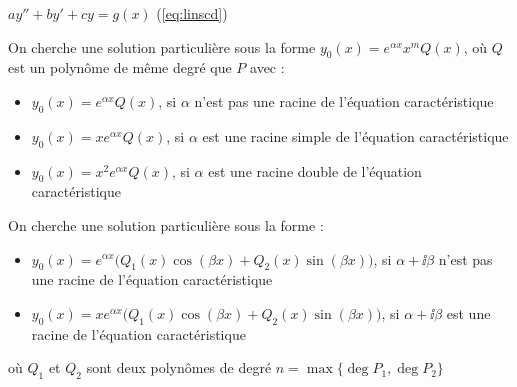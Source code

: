 \begin{frame}

 $ay''+by'+cy=g(x)$ \quad (\ref{eq:linscd})

\pause
\medskip


\pause
On cherche une solution particulière sous la forme 
$y_0(x)=e^{\alpha x}x^{m}Q(x)$, où $Q$ est un polynôme de 
même degré que $P$ avec :
\pause
\begin{itemize}
\item $y_0(x)=e^{\alpha x}Q(x)$, si $\alpha$ n'est pas une racine de l'équation caractéristique
\pause
\item $y_0(x)=xe^{\alpha x}Q(x)$, si $\alpha$ est une racine simple de l'équation caractéristique
\pause
\item $y_0(x)=x^2e^{\alpha x}Q(x)$, si $\alpha$ est une racine double de l'équation caractéristique
\end{itemize}

\pause
\medskip


\pause
On cherche une solution particulière sous la forme :
\begin{itemize}
\item $y_0(x)=e^{\alpha x} \big( Q_1(x)\cos (\beta x)+Q_2(x)\sin (\beta x) \big)$, 
si $\alpha +\ii \beta$ n'est pas une racine de l'équation caractéristique
\pause
\item $y_0(x)=xe^{\alpha x}  \big( Q_1(x)\cos (\beta x)+Q_2(x)\sin (\beta x) \big)$, 
si $\alpha +\ii \beta$ est une racine de l'équation caractéristique
\end{itemize}
\pause
où $Q_1$ et $Q_2$ sont deux polynômes de degré $n=\max\{\deg P_1,\deg P_2\}$

\end{frame}

